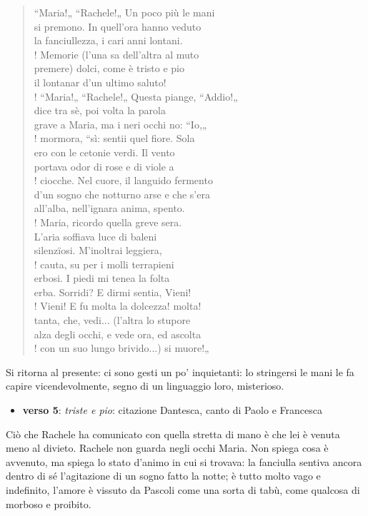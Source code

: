 \documentclass[a4paper, twoside, titlepage]{book}
\newcommand{\elenco}[1]{%
\begin{itemize}
#1
\end{itemize}}
\begin{document}
\begin{verse}
“Maria!„ “Rachele!„ Un poco più le mani\\
si premono. In quell’ora hanno veduto\\
la fanciullezza, i cari anni lontani.\\!
Memorie (l’una sa dell’altra al muto\\
premere) dolci, come è tristo e pio\\
il lontanar d’un ultimo saluto!\\!
“Maria!„ “Rachele!„ Questa piange, “Addio!„\\
dice tra sè, poi volta la parola\\
grave a Maria, ma i neri occhi no: “Io,„\\!
mormora, “sì: sentii quel fiore. Sola\\
ero con le cetonie verdi. Il vento\\
portava odor di rose e di viole a\\!
ciocche. Nel cuore, il languido fermento\\
d’un sogno che notturno arse e che s’era\\
all’alba, nell’ignara anima, spento.\\!
Maria, ricordo quella greve sera.\\
L’aria soffiava luce di baleni\\
silenzïosi. M’inoltrai leggiera,\\!
cauta, su per i molli terrapieni\\
erbosi. I piedi mi tenea la folta\\
erba. Sorridi? E dirmi sentia, Vieni!\\!
Vieni! E fu molta la dolcezza! molta!\\
tanta, che, vedi... (l’altra lo stupore\\
alza degli occhi, e vede ora, ed ascolta\\!
con un suo lungo brivido...) si muore!„
\end{verse}

Si ritorna al presente: ci sono gesti un po' inquietanti: lo stringersi le mani le fa capire vicendevolmente, segno di un linguaggio loro, misterioso.

\elenco{\item \textbf{verso 5}: \textit{triste e pio}: citazione Dantesca, canto di Paolo e Francesca}

Ciò che Rachele ha comunicato con quella stretta di mano è che lei è venuta meno al divieto. Rachele non guarda negli occhi Maria.
Non spiega cosa è avvenuto, ma spiega lo stato d'animo in cui si trovava: la fanciulla sentiva ancora dentro di sé l'agitazione di un sogno fatto la notte; è tutto molto vago e indefinito, l'amore è vissuto da Pascoli come una sorta di tabù, come qualcosa di morboso e proibito.
\end{document}
